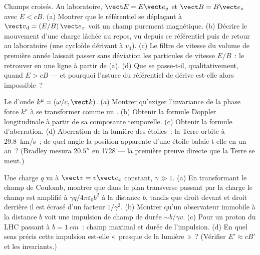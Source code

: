 \begin{exercise}[$\star\star$]\label{exo:b3:covariant-electromagnetism:7}
Champs croisés. Au laboratoire, $\vect E = E\vect e_y$ et $\vect B =
B\vect e_z$ avec $E < cB$. (a) Montrer que le référentiel se déplaçant à
$\vect v_{\text{d}} = (E/B)\,\vect e_x$ voit un champ purement magnétique.
(b) Décrire le mouvement d'une charge lâchée au repos, vu depuis ce
référentiel puis de retour au laboratoire (une cycloïde dérivant à
$v_{\text{d}}$). (c) Le filtre de vitesse du volume de première année
laissait passer sans déviation les particules de vitesse $E/B$~:
le retrouver en une ligne à partir de (a). (d) Que se passe-t-il,
qualitativement, quand $E > cB$ --- et pourquoi l'astuce du référentiel
de dérive est-elle alors impossible~?
\end{exercise}

\begin{exercise}[$\star\star$]\label{exo:b3:covariant-electromagnetism:8}
Le  d'onde $k^\mu = (\omega/c, \vect k)$. (a) Montrer
qu'exiger l'invariance de la phase force $k^\mu$ à se transformer comme
un . (b) Obtenir la formule Doppler longitudinale à partir
de sa composante temporelle. (c) Obtenir la formule d'aberration. (d)
Aberration de la lumière des étoiles~: la Terre orbite à
\qty{29.8}{km/s}~; de quel angle la position apparente d'une étoile
balaie-t-elle en un an~? (Bradley mesura $20.5''$ en 1728 --- la
première preuve directe que la Terre se meut.)
\end{exercise}

\begin{exercise}[$\star\star$]\label{exo:b3:covariant-electromagnetism:9}
Une charge $q$ va à $\vect v = v\vect e_x$ constant, $\gamma \gg
1$. (a) En transformant le champ de Coulomb, montrer que dans le plan
transverse passant par la charge le champ est amplifié à $\gamma
q/4\pi\varepsilon_0b^2$ à la distance $b$, tandis que droit devant et
droit derrière il est écrasé d'un facteur $1/\gamma^2$. (b) Montrer
qu'un observateur immobile à la distance $b$ voit une impulsion de
champ de durée $\sim b/\gamma v$. (c) Pour un proton du LHC passant à $b = \qty{1}{cm}$~:
champ maximal et durée de l'impulsion. (d) En quel sens précis cette
impulsion est-elle «~presque de la lumière~»~? (Vérifier $E' \approx cB'$
et les invariants.)
\end{exercise}

